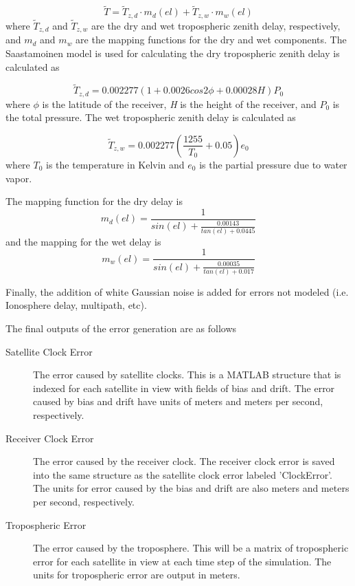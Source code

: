 \documentclass[12pt]{report}
\begin{document}
\begin{equation}
    \tilde{T} = \tilde{T}_{z,d} \cdot m_d(el) + \tilde{T}_{z,w} \cdot m_w(el)
    \label{eqn:TropError}
\end{equation}
where $\tilde{T}_{z,d}$ and $\tilde{T}_{z,w}$ are the dry and wet tropospheric zenith delay, respectively, and $m_d$ and $m_w$ are the mapping functions for the dry and wet components. The Saastamoinen model is used for calculating the dry tropospheric zenith delay is calculated as

\begin{equation}
    \tilde{T}_{z,d} = 0.002277(1+0.0026cos2\phi +0.00028H)P_0
    \label{eqn:DryZenith}
\end{equation}
where $\phi$ is the latitude of the receiver, \textit{H} is the height of the receiver, and $P_0$ is the total pressure. 
The wet tropospheric zenith delay is calculated as 

\begin{equation}
    \tilde{T}_{z,w} = 0.002277 \left( \frac{1255}{T_0} + 0.05 \right) e_0
    \label{eqn:WetZenith}
\end{equation}
where $T_0$ is the temperature in Kelvin and $e_0$ is the partial pressure due to water vapor.

The mapping function for the dry delay is 
\begin{equation}
    m_d(el) = \frac{1}{sin(el)+\frac{0.00143}{tan(el)+0.0445}}
    \label{eqn:drymapping}
\end{equation}
and the mapping for the wet delay is
\begin{equation}
    m_w(el) = \frac{1}{sin(el)+\frac{0.00035}{tan(el)+0.017}}
    \label{eqn:wetmapping}
\end{equation}

Finally, the addition of white Gaussian noise is added for errors not modeled (i.e. Ionosphere delay, multipath, etc).

The final outputs of the error generation are as follows
\begin{description}
    \item[Satellite Clock Error] The error caused by satellite clocks. This is a MATLAB structure that is indexed for each satellite in view with fields of bias and drift. The error caused by bias and drift have units of meters and meters per second, respectively.
    \item[Receiver Clock Error] The error caused by the receiver clock. The receiver clock error is saved into the same structure as the satellite clock error labeled 'ClockError'. The units for error caused by the bias and drift are also meters and meters per second, respectively.
    \item[Tropospheric Error] The error caused by the troposphere. This will be a matrix of tropospheric error for each satellite in view at each time step of the simulation. The units for tropospheric error are output in meters.
\end{description}
\end{document}
